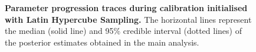 \begin{figure}[ht]
    \caption{\textbf{Parameter progression traces during calibration initialised with Latin Hypercube Sampling.} The horizontal lines represent the median (solid line) and 95\% credible interval (dotted lines) of the posterior estimates obtained in the main analysis.}
    \label{fig:lhs_experiments_traces}
\end{figure}